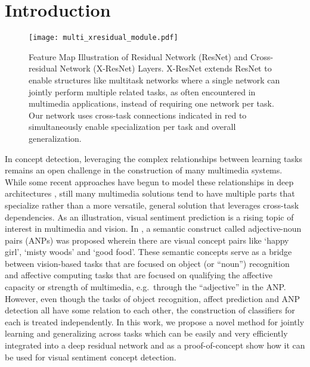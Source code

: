 \documentclass{sig-alternate-05-2015}
\begin{document}

%
%

%
%
\printccsdesc



\section{Introduction}
\label{sec:intro}

\begin{figure}[t]
  \centering
  \texttt{[image: multi\_xresidual\_module.pdf]}
  \caption{Feature Map Illustration of Residual Network (ResNet) and Cross-residual Network (X-ResNet) Layers. X-ResNet extends ResNet to enable structures like multitask networks where a single network can jointly perform multiple related tasks, as often encountered in multimedia applications, instead of requiring one network per task. Our network uses cross-task connections indicated in red to simultaneously enable specialization per task and overall generalization.}
  \label{fig:overview}
\end{figure}

In concept detection, leveraging the complex relationships between learning tasks remains an open challenge in the construction of many multimedia systems.
While some recent approaches have begun to model these relationships in deep architectures \cite{deng_2014,wu_2014}, still many multimedia solutions tend to have multiple parts that specialize rather than a more versatile, general solution that leverages cross-task dependencies.
As an illustration, visual sentiment prediction is a rising topic of interest in multimedia and vision.
In \cite{borth_2013}, a semantic construct called adjective-noun pairs (ANPs) was proposed wherein there are visual concept pairs like `happy girl', `misty woods' and `good food'.
These semantic concepts serve as a bridge between vision-based tasks that are focused on object (or ``noun'') recognition and affective computing tasks that are focused on qualifying the affective capacity or strength of multimedia, e.g.~through the ``adjective'' in the ANP.
However, even though the tasks of object recognition, affect prediction and ANP detection all have some relation to each other, the construction of classifiers for each is treated independently.
In this work, we propose a novel method for jointly learning and generalizing across tasks which can be easily and very efficiently integrated into a deep residual network and as a proof-of-concept show how it can be used for visual sentiment concept detection.
\end{document}
